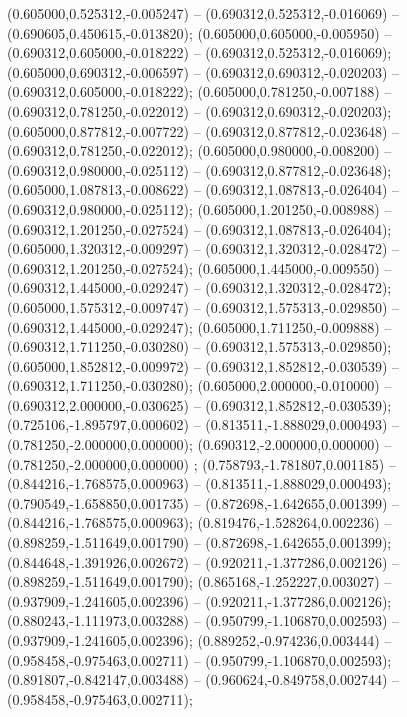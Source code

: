  (0.605000,0.525312,-0.005247) -- (0.690312,0.525312,-0.016069) -- (0.690605,0.450615,-0.013820);
 (0.605000,0.605000,-0.005950) -- (0.690312,0.605000,-0.018222) -- (0.690312,0.525312,-0.016069);
 (0.605000,0.690312,-0.006597) -- (0.690312,0.690312,-0.020203) -- (0.690312,0.605000,-0.018222);
 (0.605000,0.781250,-0.007188) -- (0.690312,0.781250,-0.022012) -- (0.690312,0.690312,-0.020203);
 (0.605000,0.877812,-0.007722) -- (0.690312,0.877812,-0.023648) -- (0.690312,0.781250,-0.022012);
 (0.605000,0.980000,-0.008200) -- (0.690312,0.980000,-0.025112) -- (0.690312,0.877812,-0.023648);
 (0.605000,1.087813,-0.008622) -- (0.690312,1.087813,-0.026404) -- (0.690312,0.980000,-0.025112);
 (0.605000,1.201250,-0.008988) -- (0.690312,1.201250,-0.027524) -- (0.690312,1.087813,-0.026404);
 (0.605000,1.320312,-0.009297) -- (0.690312,1.320312,-0.028472) -- (0.690312,1.201250,-0.027524);
 (0.605000,1.445000,-0.009550) -- (0.690312,1.445000,-0.029247) -- (0.690312,1.320312,-0.028472);
 (0.605000,1.575312,-0.009747) -- (0.690312,1.575313,-0.029850) -- (0.690312,1.445000,-0.029247);
 (0.605000,1.711250,-0.009888) -- (0.690312,1.711250,-0.030280) -- (0.690312,1.575313,-0.029850);
 (0.605000,1.852812,-0.009972) -- (0.690312,1.852812,-0.030539) -- (0.690312,1.711250,-0.030280);
 (0.605000,2.000000,-0.010000) -- (0.690312,2.000000,-0.030625) -- (0.690312,1.852812,-0.030539);
 (0.725106,-1.895797,0.000602) -- (0.813511,-1.888029,0.000493) -- (0.781250,-2.000000,0.000000);
 (0.690312,-2.000000,0.000000) -- (0.781250,-2.000000,0.000000) ;
 (0.758793,-1.781807,0.001185) -- (0.844216,-1.768575,0.000963) -- (0.813511,-1.888029,0.000493);
 (0.790549,-1.658850,0.001735) -- (0.872698,-1.642655,0.001399) -- (0.844216,-1.768575,0.000963);
 (0.819476,-1.528264,0.002236) -- (0.898259,-1.511649,0.001790) -- (0.872698,-1.642655,0.001399);
 (0.844648,-1.391926,0.002672) -- (0.920211,-1.377286,0.002126) -- (0.898259,-1.511649,0.001790);
 (0.865168,-1.252227,0.003027) -- (0.937909,-1.241605,0.002396) -- (0.920211,-1.377286,0.002126);
 (0.880243,-1.111973,0.003288) -- (0.950799,-1.106870,0.002593) -- (0.937909,-1.241605,0.002396);
 (0.889252,-0.974236,0.003444) -- (0.958458,-0.975463,0.002711) -- (0.950799,-1.106870,0.002593);
 (0.891807,-0.842147,0.003488) -- (0.960624,-0.849758,0.002744) -- (0.958458,-0.975463,0.002711);
